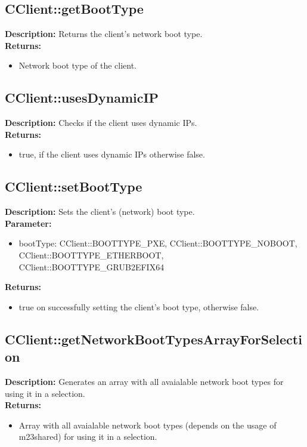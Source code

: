 \subsection{CClient::getBootType}
\textbf{Description:} Returns the client's network boot type.\\
\textbf{Returns:}
\begin{itemize}
\item Network boot type of the client.
\end{itemize}

\subsection{CClient::usesDynamicIP}
\textbf{Description:} Checks if the client uses dynamic IPs.\\
\textbf{Returns:}
\begin{itemize}
\item true, if the client uses dynamic IPs otherwise false.
\end{itemize}

\subsection{CClient::setBootType}
\textbf{Description:} Sets the client's (network) boot type.\\
\textbf{Parameter:}
\begin{itemize}
\item bootType: CClient::BOOTTYPE\_PXE, CClient::BOOTTYPE\_NOBOOT, CClient::BOOTTYPE\_ETHERBOOT, CClient::BOOTTYPE\_GRUB2EFIX64
\end{itemize}
\textbf{Returns:}
\begin{itemize}
\item true on successfully setting the client's boot type, otherwise false.
\end{itemize}

\subsection{CClient::getNetworkBootTypesArrayForSelection}
\textbf{Description:} Generates an array with all avaialable network boot types for using it in a selection.\\
\textbf{Returns:}
\begin{itemize}
\item Array with all avaialable network boot types (depends on the usage of m23shared) for using it in a selection.
\end{itemize}

